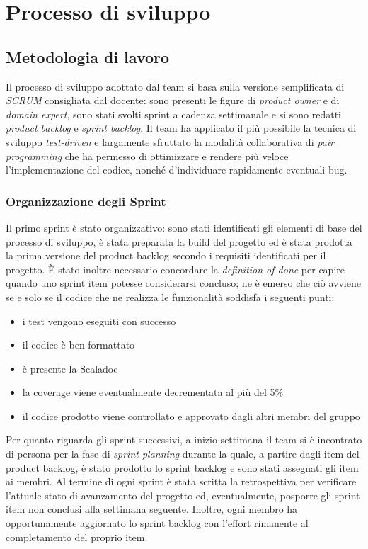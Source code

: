\chapter{Processo di sviluppo}\label{ch:processo-di-sviluppo}
\section{Metodologia di lavoro}\label{sec:metodologia-di-lavoro}
Il processo di sviluppo adottato dal team si basa sulla versione semplificata di \textit{SCRUM} consigliata dal docente:
sono presenti le figure di \textit{product owner} e di \textit{domain expert}, sono stati svolti sprint a cadenza
settimanale e si sono redatti \textit{product backlog} e \textit{sprint backlog}.
Il team ha applicato il più possibile la tecnica di sviluppo \textit{test-driven} e largamente sfruttato la modalità
collaborativa di \textit{pair programming} che ha permesso di ottimizzare e rendere più veloce l'implementazione del
codice, nonché d'individuare rapidamente eventuali bug.

\subsection{Organizzazione degli Sprint}\label{subsec:organizzazione-sprint}
Il primo sprint è stato organizzativo: sono stati identificati gli elementi di base del processo di sviluppo, è stata
preparata la build del progetto ed è stata prodotta la prima versione del product backlog secondo i requisiti
identificati per il progetto.
È stato inoltre necessario concordare la \textit{definition of done} per capire quando uno sprint item potesse
considerarsi concluso;
ne è emerso che ciò avviene se e solo se il codice che ne realizza le funzionalità soddisfa i seguenti punti:
\begin{itemize}
    \item i test vengono eseguiti con successo
    \item il codice è ben formattato
    \item è presente la Scaladoc
    \item la coverage viene eventualmente decrementata al più del 5\%
    \item il codice prodotto viene controllato e approvato dagli altri membri del gruppo
\end{itemize}
Per quanto riguarda gli sprint successivi, a inizio settimana il team si è incontrato di persona per la fase di
\textit{sprint planning} durante la quale, a partire dagli item del product backlog, è stato prodotto lo
sprint backlog e sono stati assegnati gli item ai membri.
Al termine di ogni sprint è stata scritta la retrospettiva per verificare l'attuale stato di avanzamento del progetto
ed, eventualmente, posporre gli sprint item non conclusi alla settimana seguente.
Inoltre, ogni membro ha opportunamente aggiornato lo sprint backlog con l'effort rimanente al completamento del
proprio item.

